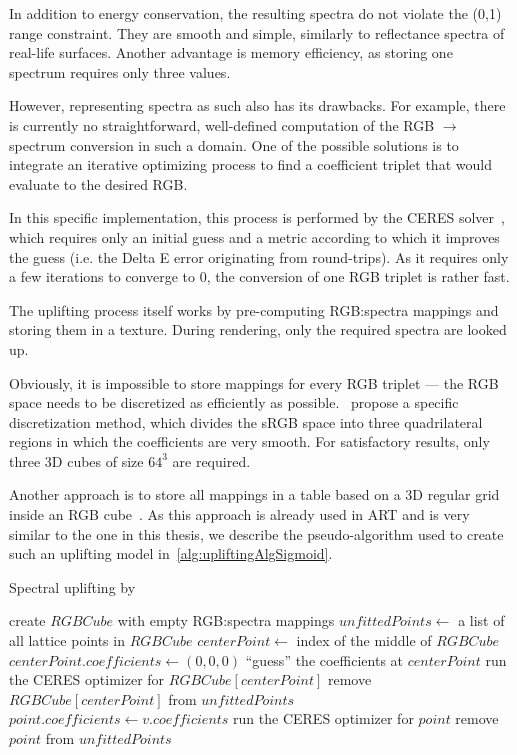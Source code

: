 In addition to energy conservation, the resulting spectra do not violate the (0,1) range constraint. They are smooth and simple, similarly to reflectance spectra of real-life surfaces. Another advantage is memory efficiency, as storing one spectrum requires only three values.

However, representing spectra as such also has its drawbacks. For example, there is currently no straightforward, well-defined computation of the RGB $\to$ spectrum conversion in such a domain. One of the possible solutions is to integrate an iterative optimizing process to find a coefficient triplet that would evaluate to the desired RGB.

In this specific implementation, this process is performed by the CERES solver~\cite{ceres-solver}, which requires only an initial guess and a metric according to which it improves the guess (i.e. the Delta E error originating from round-trips). As it requires only a few iterations to converge to 0, the conversion of one RGB triplet is rather fast.

The uplifting process itself works by pre-computing RGB:spectra mappings and storing them in a texture. During rendering, only the required spectra are looked up.

Obviously, it is impossible to store mappings for every RGB triplet --- the RGB space needs to be discretized as efficiently as possible.~\citet{upsamplingJakobHanika} propose a specific discretization method, which divides the sRGB space into three quadrilateral regions in which the coefficients are very smooth. For satisfactory results, only three 3D cubes of size $64^3$ are required.

Another approach is to store all mappings in a table based on a 3D regular grid inside an RGB cube~\cite{upsamplingFluorescence}. As this approach is already used in ART and is very similar to the one in this thesis, we describe the pseudo-algorithm used to create such an uplifting model in~\cref{alg:upliftingAlgSigmoid}.

\begin{algorithm}[t!]
	\caption{Spectral uplifting by~\citet{upsamplingJakobHanika}}
	\label{alg:upliftingAlgSigmoid}
	\begin{algorithmic}[1]
		\State create $RGBCube$ with empty RGB:spectra mappings
		\State $unfittedPoints \gets$ a list of all lattice points in $RGBCube$
		\State $centerPoint \gets$ index of the middle of $RGBCube$
		\Statex {}
		\State $centerPoint.coefficients \gets (0,0,0)$
		\Statex \Comment ``guess'' the coefficients at $centerPoint$
		\State run the CERES optimizer for $RGBCube[centerPoint]$
		\State remove $RGBCube[centerPoint]$ from $unfittedPoints$
		\State $point.coefficients \gets v.coefficients$
		\State run the CERES optimizer for $point$
		\State remove $point$ from $unfittedPoints$
		\EndIf
		\EndIf
		\EndFor
		\EndWhile
	\end{algorithmic}
\end{algorithm}

